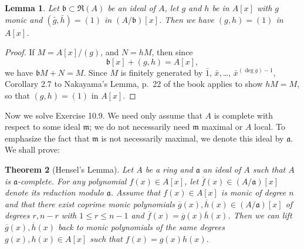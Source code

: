 \documentclass[parskip=half,fontsize=12pt]{scrartcl}%
\newcommand{\mf}{\mathfrak}
\newcommand{\aaa}{\mf a}
\newcommand{\bbb}{\mf b}
\newcommand{\mmm}{\mf m}
\newtheorem{thm}{Theorem}%
\newtheorem{lem}[thm]{Lemma}
\begin{document}
\begin{lem}\label{L106b}
Let $\bbb\subset\mf R(A)$ be an ideal of $A$, let $g$ and $h$ be in $A[x]$ with $g$ monic and $(\bar g,\bar h)=(1)$ in $(A/\bbb)[x]$. Then we have $(g,h)=(1)$ in $A[x]$. 
\end{lem} 
\begin{proof} 
If $M=A[x]/(g)$, and $N=hM$, then since 
$$
\bbb[x]+(g, h)=A[x],
$$ 
we have $\bbb M+N=M$. Since $M$ is finitely generated by $\bar 1$, $\bar x, $\dots, $\bar x^{(\deg g)-1}$, Corollary 2.7 to Nakayama’s Lemma, p.~22 of the book applies to show $hM=M$, so that $(g,h)=(1)$ in $A[x]$. 
\end{proof} 

Now we solve Exercise 10.9. We need only assume that $A$ is complete with respect to some ideal $\mmm$; we do not necessarily need $\mmm$ maximal or $A$ local. To emphasize the fact that $\mmm$ is not necessarily maximal, we denote this ideal by $\aaa$. %
We shall prove: %

\begin{thm}[Hensel's Lemma]\label{hl}
Let $A$ be a ring and $\aaa$ an ideal of $A$ such that $A$ is $\aaa$-complete. For any polynomial $f(x)\in A[x]$, let $\overline f(x)\in(A/\aaa)[x]$ denote its reduction modulo $\aaa$. Assume that $f(x)\in A[x]$ is monic of degree $n$ and that there exist coprime monic polynomials $\overline g(x),\overline h(x)\in(A/\aaa)[x]$ of degrees $r,n-r$ with $1\le r\le n-1$ and $\overline f(x)=\overline g(x)\overline h(x)$. Then we can lift $\overline g(x),\overline h(x)$ back to monic polynomials of the same degrees $g(x),h(x)\in A[x]$ such that $f(x)=g(x)h(x)$.
\end{thm}
\end{document}
